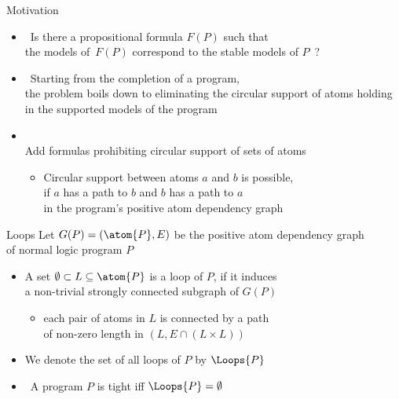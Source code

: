 \begin{frame}{Motivation}
  \begin{itemize}
  \item<1->  \
    Is there a propositional formula $F(P)$ such that\\ the models of~$F(P)$ correspond to the
    stable models of $P$~?
    \bigskip
  \item<2->  \
    Starting from the completion of a program,\\
    the problem boils down to eliminating the circular support of atoms
    holding in the supported models of the program
    \bigskip
  \item<3->  \\
    \smallskip
    Add formulas prohibiting circular support of sets of atoms
    \medskip
    \begin{itemize}\normalsize
    \item<4->[\itarrow]
      Circular support between atoms $a$ and $b$ is possible,\\
      if $a$ has a path to $b$ and $b$ has a path to $a$\\
      in the program's positive atom dependency graph
    \end{itemize}
  \end{itemize}
\end{frame}
\begin{frame}{Loops}
  \bigskip
  Let $G(P) = (\atom{P},E)$ be the positive atom dependency graph\\ of normal logic program $P$
  \par
  \smallskip
  \begin{itemize}
  \item<2-> A set $\emptyset\subset L \subseteq \atom{P}$ is a \alert{loop} of $P$,
    if it induces\\ a non-trivial strongly connected subgraph of $G(P)$
    \begin{itemize}\normalsize
    \item<3->[\itarrow] each pair of atoms in $L$ is connected by a path\\
      of non-zero length in $(L,E\cap(L \times L))$
    \end{itemize}
    \medskip
  \item<4-> We denote the set of all loops of $P$ by $\Loops{P}$
    \medskip
  \item<5-> \structure{Note} \ A program $P$ is tight iff $\Loops{P}=\emptyset$
  \end{itemize}
\end{frame}
